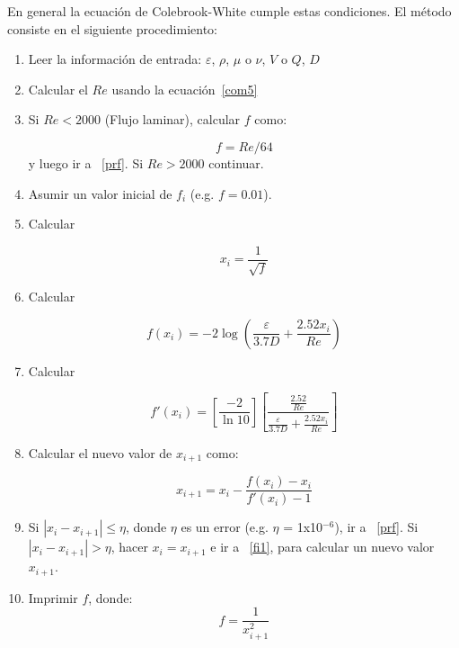 \documentclass[10pt, oneside]{article}
\begin{document}
En general la ecuaci\'on de Colebrook-White cumple estas condiciones. El m\'etodo consiste en el siguiente procedimiento:

\begin{enumerate} 
\item Leer la informaci\'on de entrada: $\varepsilon$, $\rho$, $\mu$ o $\nu$, $V$ o $Q$, $D$ 
\item Calcular el $Re$ usando la ecuaci\'on~\ref{com5}
\item Si $Re<2000$ (Flujo laminar), calcular $f$ como:

\begin{equation}
f=Re/64 
\label{com7a}
\end{equation}
y luego ir a ~\ref{prf}. Si $Re > 2000$ continuar.

\item Asumir un valor inicial de $f_i$ (e.g. $f=0.01$).
\item Calcular 

\begin{equation}
x_i = \frac{1}{\sqrt{f}}
\label{com9}
\end{equation}

\item \label{fi1} Calcular 

\begin{equation}
f(x_i ) =  -2 \log \left( \frac{\varepsilon}{3.7D} + \frac{2.52 x_i }{Re} \right)
\label{com10}
\end{equation}

\item Calcular 

\begin{equation}
f' (x_i ) =\left[\frac{-2}{\ln 10} \right] \left[ \frac{\frac{2.52}{Re}}{\frac{\varepsilon}{3.7D}+\frac{2.52 x_i }{Re}}\right] 
\label{com11}
\end{equation}

\item Calcular el nuevo valor de $x_{i+1}$ como:

\begin{equation}
 x_{i+1} = x_{i} - \frac{f(x_i ) - x_i}{f'(x_i ) -1} 
\label{com12}
\end{equation}

\item Si $|x_{i}- x_{i+1}| \leq \eta$, donde $\eta$ es un error  (e.g. $\eta$ = 1x10$^{-6}$), ir a ~\ref{prf}. Si $|x_{i}- x_{i+1}| > \eta$, hacer $x_i = x_{i+1}$ e ir a ~\ref{fi1},  para  calcular un nuevo valor $x_{i+1}$.

\item \label{prf} Imprimir $f$, donde:
\begin{equation}
f = \frac{1}{x_{i+1}^2}
\label{com12}
\end{equation}

\end{enumerate} 
\end{document}
